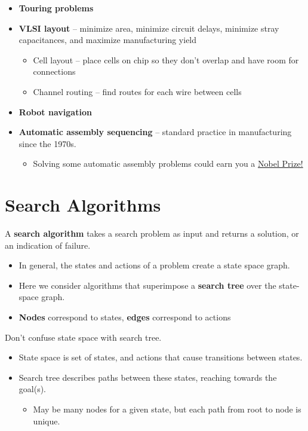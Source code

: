 \documentclass[11pt]{article}
\begin{document}
\begin{itemize}
\item \textbf{Touring problems}
\item \textbf{VLSI layout} -- minimize area, minimize circuit delays, minimize stray capacitances, and maximize manufacturing yield

\begin{itemize}
\item Cell layout -- place cells on chip so they don't overlap and have room for connections
\item Channel routing -- find routes for each wire between cells
\end{itemize}

\item \textbf{Robot navigation}
\item \textbf{Automatic assembly sequencing} -- standard practice in manufacturing since the 1970s.

\begin{itemize}
\item Solving some automatic assembly problems could earn you a \href{https://deepmind.google/science/alphafold/}{Nobel Prize!}
\end{itemize}
\end{itemize}
\section{Search Algorithms}
\label{sec:org614fde9}

A \textbf{search algorithm} takes a search problem as input and returns a solution, or an indication of failure.

\begin{itemize}
\item In general, the states and actions of a problem create a state space graph.
\item Here we consider algorithms that superimpose a \textbf{search tree} over the state-space graph.
\item \textbf{Nodes} correspond to states, \textbf{edges} correspond to actions
\end{itemize}

Don't confuse state space with search tree.

\begin{itemize}
\item State space is set of states, and actions that cause transitions between states.
\item Search tree describes paths between these states, reaching towards the goal(s).

\begin{itemize}
\item May be many nodes for a given state, but each path from root to node is unique.
\end{itemize}
\end{itemize}
\end{document}
